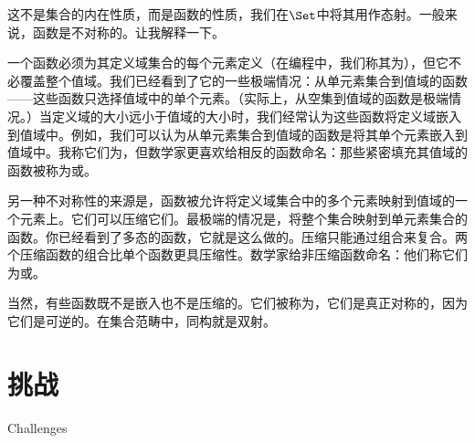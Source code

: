 这不是集合的内在性质，而是函数的性质，我们在$\Set$中将其用作态射。一般来说，函数是不对称的。让我解释一下。

一个函数必须为其定义域集合的每个元素定义（在编程中，我们称其为），但它不必覆盖整个值域。我们已经看到了它的一些极端情况：从单元素集合到值域的函数——这些函数只选择值域中的单个元素。（实际上，从空集到值域的函数是极端情况。）当定义域的大小远小于值域的大小时，我们经常认为这些函数将定义域嵌入到值域中。例如，我们可以认为从单元素集合到值域的函数是将其单个元素嵌入到值域中。我称它们为，但数学家更喜欢给相反的函数命名：那些紧密填充其值域的函数被称为或。

另一种不对称性的来源是，函数被允许将定义域集合中的多个元素映射到值域的一个元素上。它们可以压缩它们。最极端的情况是，将整个集合映射到单元素集合的函数。你已经看到了多态的函数，它就是这么做的。压缩只能通过组合来复合。两个压缩函数的组合比单个函数更具压缩性。数学家给非压缩函数命名：他们称它们为或。

当然，有些函数既不是嵌入也不是压缩的。它们被称为，它们是真正对称的，因为它们是可逆的。在集合范畴中，同构就是双射。

\section{挑战}{Challenges}

